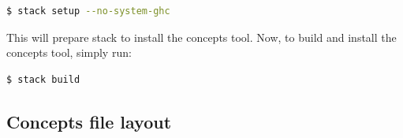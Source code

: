 \documentclass[british,conference,compsoc]{IEEEtran}
\begin{document}
\vspace{-2mm}

\begin{lstlisting}[language=bash]
  $ stack setup --no-system-ghc
\end{lstlisting}

\vspace{-1mm}

This will prepare stack to install the concepts tool. Now, to build and install
the concepts tool, simply run:

\vspace{-1mm}

\begin{lstlisting}[language=bash]
  $ stack build
\end{lstlisting}

\vspace{-5mm}

\subsection{Concepts file layout \label{sub:file_layout}}

\vspace{-5mm}
\end{document}
